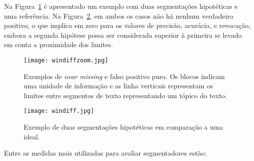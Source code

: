 Na Figura~\ref{fig:exemplosegmentacaozoom} é apresentado um exemplo com duas segmentações hipotéticas e uma referência. Na Figura~\ref{fig:exemplosegmentacao}, em ambos os casos não há nenhum verdadeiro positivo, o que implica em zero para os valores de precisão, acurácia, e revocação, embora a segunda hipótese possa ser considerada superior à primeira se levado em conta a proximidade dos limites.



  \begin{figure}[!h]

	\centering
	\texttt{[image: windiffzoom.jpg]}
	\caption{Exemplos de \textit{near missing} e falso positivo puro. Os blocos indicam uma unidade de informação e as linha verticais representam os limites entre segmentos de texto representando um tópico do texto. }
	\label{fig:exemplosegmentacaozoom}

  \end{figure}
  
  \begin{figure}[!h]

	\centering
	\texttt{[image: windiff.jpg]}
	\caption{
	Exemplo de duas segmentações hipotéticas em comparação a uma ideal. 
	}
	\label{fig:exemplosegmentacao}

  \end{figure}
  
  
Entre as medidas mais utilizadas para avaliar segmentadores estão:

